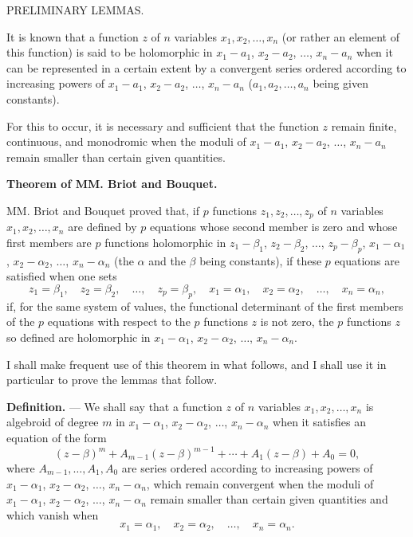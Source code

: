\documentclass[11pt]{article}
\begin{document}
\begin{center}
{\large PRELIMINARY LEMMAS.}
\end{center}

It is known that a function $z$ of $n$ variables $x_1,x_2,\ldots,x_n$ (or rather an element of this function) is said to be holomorphic in $x_1-a_1$, $x_2-a_2$, $\ldots$, $x_n-a_n$ when it can be represented in a certain extent by a convergent series ordered according to increasing powers of $x_1-a_1$, $x_2-a_2$, $\ldots$, $x_n-a_n$ ($a_1,a_2,\ldots,a_n$ being given constants).

For this to occur, it is necessary and sufficient that the function $z$ remain finite, continuous, and monodromic when the moduli of $x_1-a_1$, $x_2-a_2$, $\ldots$, $x_n-a_n$ remain smaller than certain given quantities.

\begin{center}
\textbf{Theorem of MM. Briot and Bouquet.}
\end{center}

MM. Briot and Bouquet proved that, if $p$ functions $z_1,z_2,\ldots,z_p$ of $n$ variables $x_1,x_2,\ldots,x_n$ are defined by $p$ equations whose second member is zero and whose first members are $p$ functions holomorphic in $z_1-\beta_1$, $z_2-\beta_2$, $\ldots$, $z_p-\beta_p$, $x_1-\alpha_1$, $x_2-\alpha_2$, $\ldots$, $x_n-\alpha_n$ (the $\alpha$ and the $\beta$ being constants), if these $p$ equations are satisfied when one sets
\[
z_1=\beta_1,\quad z_2=\beta_2,\quad \ldots,\quad z_p=\beta_p,
\quad x_1=\alpha_1,\quad x_2=\alpha_2,\quad \ldots,\quad x_n=\alpha_n,
\]
if, for the same system of values, the functional determinant of the first members of the $p$ equations with respect to the $p$ functions $z$ is not zero, the $p$ functions $z$ so defined are holomorphic in $x_1-\alpha_1$, $x_2-\alpha_2$, $\ldots$, $x_n-\alpha_n$.

I shall make frequent use of this theorem in what follows, and I shall use it in particular to prove the lemmas that follow.

\medskip
\noindent\textbf{Definition.} — We shall say that a function $z$ of $n$ variables $x_1,x_2,\ldots,x_n$ is algebroid of degree $m$ in $x_1-\alpha_1$, $x_2-\alpha_2$, $\ldots$, $x_n-\alpha_n$ when it satisfies an equation of the form
\[
(z-\beta)^m+A_{m-1}(z-\beta)^{m-1}+\cdots+A_1(z-\beta)+A_0=0,
\]
where $A_{m-1},\ldots,A_1,A_0$ are series ordered according to increasing powers of $x_1-\alpha_1$, $x_2-\alpha_2$, $\ldots$, $x_n-\alpha_n$, which remain convergent when the moduli of $x_1-\alpha_1$, $x_2-\alpha_2$, $\ldots$, $x_n-\alpha_n$ remain smaller than certain given quantities and which vanish when
\[
x_1=\alpha_1,
\quad x_2=\alpha_2,
\quad \ldots,
\quad x_n=\alpha_n.
\]
\end{document}
